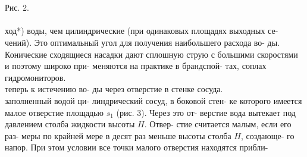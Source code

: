 \renewcommand{\footnoterule}{\vspace*{-3pt} %
    \hrule \columnwidth
    \vspace*{2.6pt}}
\newpage
{}
\begin{minipage}[t]{0.44\textwidth}
        \\
        \\
        Рис. 2.\\
        \\
	ход*) воды, чем цилиндрические (при\linebreak
        одинаковых площадях выходных се-\linebreak
        чений). Это оптимальный угол для\linebreak
        получения наибольшего расхода во-\linebreak
        ды. Конические сходящиеся насадки\linebreak
        дают сплошную струю с большими\linebreak
        скоростями и поэтому широко при-\linebreak
        меняются на практике в брандспой-\linebreak
        тах, соплах гидромониторов.\\
        \null{} теперь к истечению во-\linebreak
        ды через отверстие в стенке сосуда.\\
        \null{} заполненный водой ци-\linebreak
        линдрический сосуд, в боковой стен-\linebreak
        ке которого имеется малое отверстие\linebreak
        площадью $s_1$ (рис. 3). Через это от-\linebreak
        верстие вода вытекает под давлением\linebreak
        столба жидкости высоты $H$. Отвер-\linebreak
        стие считается малым, если его раз-\linebreak
        меры по крайней мере в десят раз\linebreak
        меньше высоты столба $H$, создающе-\linebreak
        го напор. При этом условии все точки\linebreak
        малого отверстия находятся прибли-\linebreak

\end{minipage}
